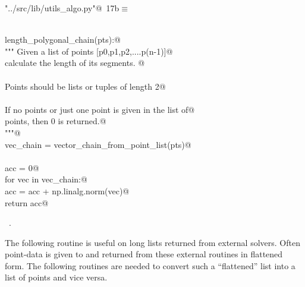 \documentclass[11.5pt]{report}
\begin{document}
\begin{flushleft} \small\label{scrap9}\raggedright\small
{} \verb@"../src/lib/utils_algo.py"@\nobreak\ {\footnotesize {17b}}$\equiv$
\vspace{-1ex}
\begin{list}{}{} \item
\mbox{}\verb@@\\
\mbox{}\verb@def length_polygonal_chain(pts):@\\
\mbox{}\verb@    """ Given a list of points [p0,p1,p2,....p(n-1)]@\\
\mbox{}\verb@    calculate the length of its segments. @\\
\mbox{}\verb@@\\
\mbox{}\verb@    Points should be lists or tuples of length 2@\\
\mbox{}\verb@@\\
\mbox{}\verb@    If no points or just one point is given in the list of@\\
\mbox{}\verb@    points, then 0 is returned.@\\
\mbox{}\verb@    """@\\
\mbox{}\verb@    vec_chain = vector_chain_from_point_list(pts)@\\
\mbox{}\verb@@\\
\mbox{}\verb@    acc = 0@\\
\mbox{}\verb@    for vec in vec_chain:@\\
\mbox{}\verb@        acc = acc + np.linalg.norm(vec)@\\
\mbox{}\verb@    return acc@\\
\mbox{}\verb@@{\NWsep}
\end{list}
\vspace{-1.5ex}
\footnotesize
\begin{list}{}{\setlength{\itemsep}{-\parsep}\setlength{\itemindent}{-\leftmargin}}
\item \NWtxtFileDefBy\ .

\item{}
\end{list}
\vspace{4ex}
\end{flushleft}
\newchunk The following routine is useful on long lists returned from external solvers. 
Often point-data is given to and returned from these external routines in flattened
form. The following routines are needed to convert such a ``flattened'' list into 
a list of points and vice versa. 
\end{document}
